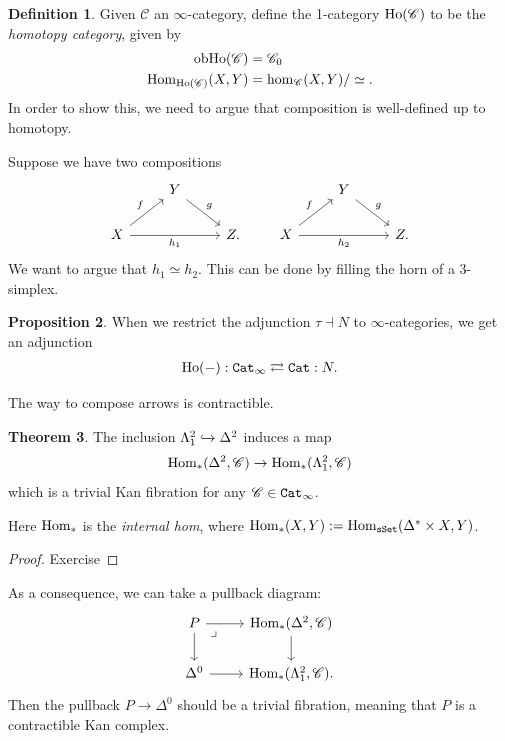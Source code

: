 \documentclass[12pt]{amsart}
\theoremstyle{definition}
\newtheorem{theorem}{Theorem}[section]
\newtheorem{definition}[theorem]{Definition}
\newtheorem{proposition}[theorem]{Proposition}
\begin{document}
\begin{definition} Given $\mathscr{C}$ an $\infty$-category, define the 1-category $\text{Ho}(\mathscr{C})$ to be the \textit{homotopy category}, given by
\begin{align*}
    \text{ob} \text{Ho}(\mathscr{C}) &= \mathscr{C}_0 \\
    \text{Hom}_{\text{Ho}(\mathscr{C})}(X,Y) &= \hom_\mathscr{C}(X,Y)/\simeq.
\end{align*}
In order to show this, we need to argue that composition is well-defined up to homotopy.
\end{definition}

Suppose we have two compositions
\[ \begin{tikzcd}
     & Y\ar[dr,"g" above right] & \\
    X\ar[ur,"f" above left]\ar[rr,"h_1" below] &  & Z.
\end{tikzcd} \quad\quad  \begin{tikzcd}
     & Y\ar[dr,"g" above right] & \\
    X\ar[ur,"f" above left]\ar[rr,"h_2" below] &  & Z.
\end{tikzcd} \]
We want to argue that $h_1 \simeq h_2$. This can be done by filling the horn of a 3-simplex.

\begin{proposition} When we restrict the adjunction $\tau \dashv N$ to $\infty$-categories, we get an adjunction
\begin{align*}
    \text{Ho}(-): \texttt{Cat}_\infty \rightleftarrows \texttt{Cat}: N.
\end{align*}
\end{proposition}

The way to compose arrows is contractible.

\begin{theorem} The inclusion $\Lambda^2_1 \xhookrightarrow{} \Delta^2$ induces a map
\begin{align*}
    \text{Hom}_\ast(\Delta^2, \mathscr{C}) \to \text{Hom}_\ast(\Lambda^2_1, \mathscr{C})
\end{align*}
which is a trivial Kan fibration for any $\mathscr{C}\in \texttt{Cat}_\infty$.
\end{theorem}
Here $\text{Hom}_\ast$ is the \textit{internal hom}, where $\text{Hom}_\ast(X,Y) := \text{Hom}_{\texttt{sSet}}(\Delta^\ast \times X, Y)$.
\begin{proof} Exercise
\end{proof}

As a consequence, we can take a pullback diagram:
\[ \begin{tikzcd}
    P\pb\rar\dar & \Hom_\ast(\Delta^2,\mathscr{C})\dar\\
    \Delta^0\rar & \Hom_\ast(\Lambda^2_1,\mathscr{C}).
\end{tikzcd} \]
Then the pullback $P \to \Delta^0$ should be a trivial fibration, meaning that $P$ is a contractible Kan complex.
\end{document}
